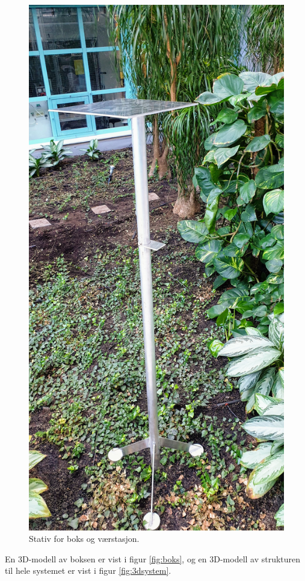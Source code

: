
\begin{figure}[!htbp]
    \centering
    \includegraphics[trim={0 0 0 20cm}, clip, width=.5\textwidth]{implementering/Stativ.jpg}
    \caption{Stativ for boks og værstasjon.}
    \label{fig:Stativ}
\end{figure}

En 3D-modell av boksen er vist i figur \ref{fig:boks}, og en 3D-modell av strukturen til hele systemet er vist i figur \ref{fig:3dsystem}.

